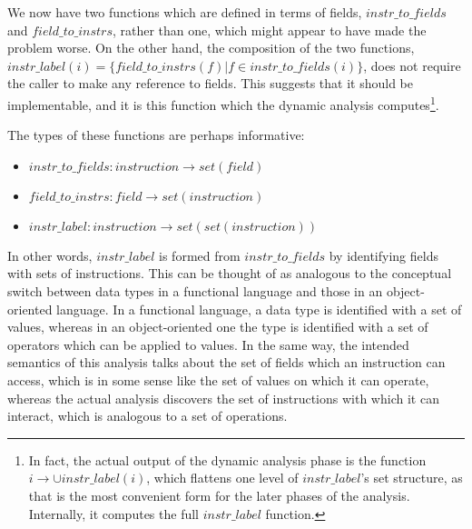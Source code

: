 We now have two functions which are defined in terms of fields,
$\mathit{instr\_to\_fields}$ and $\mathit{field\_to\_instrs}$, rather
than one, which might appear to have made the problem worse.  On the
other hand, the composition of the two functions,
$\mathit{instr\_label}(i) = \{\mathit{field\_to\_instrs}(f) | f \in
\mathit{instr\_to\_fields}(i)\}$, does not require the caller to make
any reference to fields.  This suggests that it should be
implementable, and it is this function which the dynamic analysis
computes\footnote{In fact, the actual output of the {\implementation}
  dynamic analysis phase is the function $i \rightarrow \cup
  \mathit{instr\_label}(i)$, which flattens one level of
  $\mathit{instr\_label}$'s set structure, as that is the most
  convenient form for the later phases of the analysis.  Internally,
  it computes the full $\mathit{instr\_label}$ function.}.

The types of these functions are perhaps informative:

\begin{itemize}
\item $\mathit{instr\_to\_fields}: \mathit{instruction} \rightarrow \mathit{set}(\mathit{field})$
\item $\mathit{field\_to\_instrs}: \mathit{field} \rightarrow \mathit{set}(\mathit{instruction})$
\item $\mathit{instr\_label}: \mathit{instruction} \rightarrow \mathit{set}(\mathit{set}(\mathit{instruction}))$
\end{itemize}

In other words, $\mathit{instr\_label}$ is formed from
$\mathit{instr\_to\_fields}$ by identifying fields with sets of
instructions.  This can be thought of as analogous to the conceptual
switch between data types in a functional language and those in an
object-oriented language.  In
a functional language, a data type is identified with a set of
values\needCite{}, whereas in an object-oriented one the type is
identified with a set of operators which can be applied to
values\needCite{}.  In the same way, the intended semantics of this
analysis talks about the set of fields which an instruction can
access, which is in some sense like the set of values on which it can
operate, whereas the actual analysis discovers the set of instructions
with which it can interact, which is analogous to a set of operations.


